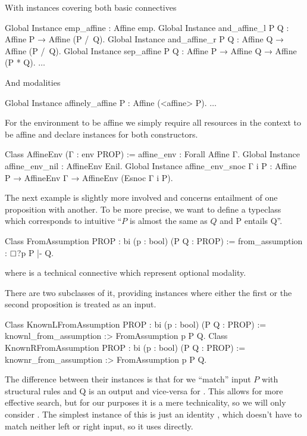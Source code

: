 With instances covering both basic connectives
\begin{coq}
Global Instance emp_affine : Affine emp.
Global Instance and_affine_l P Q : Affine P → Affine (P /\ Q).
Global Instance and_affine_r P Q : Affine Q → Affine (P /\ Q).
Global Instance sep_affine P Q : Affine P → Affine Q → Affine (P * Q).
$\ldots$
\end{coq}

And modalities
\begin{coq}
Global Instance affinely_affine P : Affine (<affine> P).
$\ldots$
\end{coq}

For the environment to be affine we simply require all resources in the context to be affine and declare instances for both constructors.
\begin{coq}
Class AffineEnv (Γ : env PROP) := affine_env : Forall Affine Γ.
Global Instance affine_env_nil : AffineEnv Enil.
Global Instance affine_env_snoc Γ i P :
  Affine P → AffineEnv Γ → AffineEnv (Esnoc Γ i P).
\end{coq}

The next example is slightly more involved and concerns entailment of one proposition with another.
To be more precise, we want to define a typeclass which corresponds to intuitive ``\(P\) is almost the same as \(Q\) and P entails Q''.
\begin{coq}
Class FromAssumption {PROP : bi} (p : bool) (P Q : PROP) :=
  from_assumption : $\mathop{\Box}$?p P |- Q.
\end{coq}
where  is a technical connective which represent optional modality.

There are two subclasses of it, providing instances where either the first or the second proposition is treated as an input.
\begin{coq}
Class KnownLFromAssumption {PROP : bi} (p : bool) (P Q : PROP) :=
  knownl_from_assumption :> FromAssumption p P Q.
Class KnownRFromAssumption {PROP : bi} (p : bool) (P Q : PROP) :=
  knownr_from_assumption :> FromAssumption p P Q.
\end{coq}

The difference between their instances is that for  we ``match'' input \(P\) with structural rules and Q is an output and vice-versa for .
This allows for more effective search, but for our purposes it is a mere technicality, so we will only consider .
The simplest instance of this is just an identity , which doesn't have to match neither left or right input, so it uses  directly.

